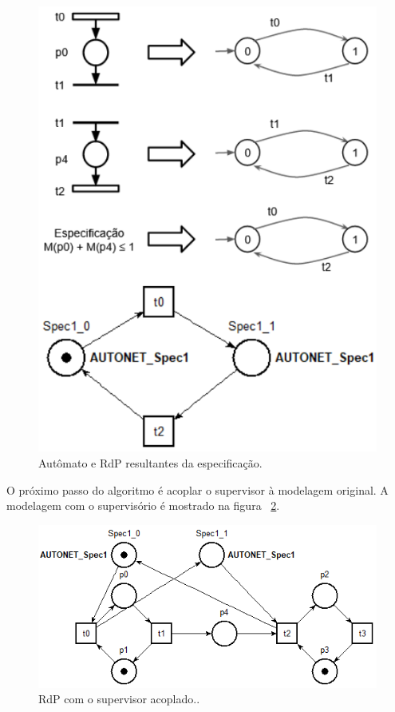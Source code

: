 \begin{figure}[!htb]
	\caption[Autômato e RdP resultantes da especifica\c{c}\~ao.]{Autômato e RdP resultantes da especifica\c{c}\~ao.}
	\label{fig:pqnafabespec}
	\includegraphics[width=16cm]{./figuras/PQNAFABESPEC.png}\centering
\end{figure}

O pr\'oximo passo do algoritmo \'e acoplar o supervisor \`a modelagem original. A modelagem com o supervis\'orio \'e mostrado na figura ~\ref{fig:pqnafabsup}.

\begin{figure}[!htb]
	\caption[RdP com o supervisor acoplado.]{RdP com o supervisor acoplado..}
	\label{fig:pqnafabsup}
	\includegraphics[width=16cm]{./figuras/PQNAFABSUP.png}\centering
\end{figure}

